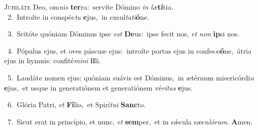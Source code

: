 \lettrine{\initial\textcolor{\initialcolor}{J}}{ubiláte} Deo, om\textit{nis} \textbf{ter}\-ra:~\star servíte Dómino \textit{in} \textit{læ}\-\textbf{tí}tia.\\
{\numbfont\textcolor{\numbcolor}{~2.}}~Introíte in conspéc\textit{tu} \textbf{e}\-jus,~\star in exsul\-\textit{ta}\-\textit{ti}\textbf{ó}ne.\par
{\numbfont\textcolor{\numbcolor}{~3.}}~Scitóte quóniam Dóminus ipse \textit{est} \textbf{De}\-us:~\star ipse fecit nos, \textit{et} \textit{non} \textbf{ip}\-si nos.\par
{\numbfont\textcolor{\numbcolor}{~4.}}~Pópulus ejus, et oves páscuæ ejus:~\dagger introíte portas ejus in confes\-\textit{si}\-\textbf{ó}ne,~\star átria ejus in hymnis: confité\-\textit{mi}\-\textit{ni} \textbf{il}\-li.\par
{\numbfont\textcolor{\numbcolor}{~5.}}~Laudáte nomen ejus: quóniam suávis est Dóminus,~\dagger in ætérnum misericórdi\textit{a} \textbf{e}\-jus,~\star et usque in generatiónem et generatiónem vé\-\textit{ri}\-\textit{tas} \textbf{e}\-jus.\par
{\numbfont\textcolor{\numbcolor}{~6.}}~Glória Patri, \textit{et} \textbf{Fí}\-lio,~\star et Spirí\-\textit{tu}\-\textit{i} \textbf{Sanc}\-to.\par
{\numbfont\textcolor{\numbcolor}{~7.}}~Sicut erat in princípio, et nunc, \textit{et} \textbf{sem}\-per,~\star et in sǽcula sæcu\-\textit{ló}\-\textit{rum}. \textbf{A}\-men.\par

